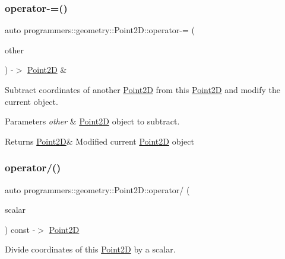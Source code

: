 \subsubsection{\texorpdfstring{operator-\/=()}{operator-=()}}
{\footnotesize\ttfamily auto programmers\+::geometry\+::\+Point2\+D\+::operator-\/= (\begin{DoxyParamCaption}\item[{const \hyperlink{classprogrammers_1_1geometry_1_1Point2D}{Point2D} \&}]{other }\end{DoxyParamCaption}) -\/$>$  \hyperlink{classprogrammers_1_1geometry_1_1Point2D}{Point2D} \&}



Subtract coordinates of another \hyperlink{classprogrammers_1_1geometry_1_1Point2D}{Point2D} from this \hyperlink{classprogrammers_1_1geometry_1_1Point2D}{Point2D} and modify the current object. 


\begin{DoxyParams}{Parameters}
{\em other} & \hyperlink{classprogrammers_1_1geometry_1_1Point2D}{Point2D} object to subtract. \\
\hline
\end{DoxyParams}
\begin{DoxyReturn}{Returns}
\hyperlink{classprogrammers_1_1geometry_1_1Point2D}{Point2D}\& Modified current \hyperlink{classprogrammers_1_1geometry_1_1Point2D}{Point2D} object 
\end{DoxyReturn}
\mbox{\label{classprogrammers_1_1geometry_1_1Point2D_ad7cccfc72a15a6ff83cc583752d28dd4}} 
\subsubsection{\texorpdfstring{operator/()}{operator/()}}
{\footnotesize\ttfamily auto programmers\+::geometry\+::\+Point2\+D\+::operator/ (\begin{DoxyParamCaption}\item[{double}]{scalar }\end{DoxyParamCaption}) const -\/$>$  \hyperlink{classprogrammers_1_1geometry_1_1Point2D}{Point2D}}



Divide coordinates of this \hyperlink{classprogrammers_1_1geometry_1_1Point2D}{Point2D} by a scalar. 


